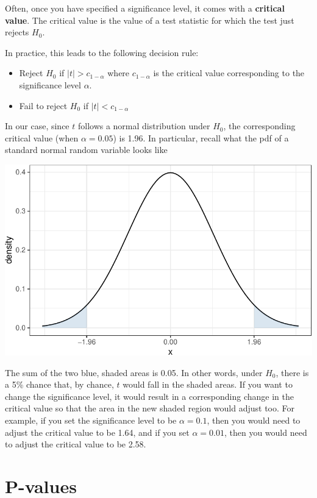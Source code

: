 \documentclass[
  letterpaper,
  DIV=11,
  numbers=noendperiod]{scrreprt}
\begin{document}
Often, once you have specified a significance level, it comes with a
\textbf{critical value}. The critical value is the value of a test
statistic for which the test just rejects \(H_0\).

In practice, this leads to the following decision rule:

\begin{itemize}
\item
  Reject \(H_0\) if \(|t| > c_{1-\alpha}\) where \(c_{1-\alpha}\) is the
  critical value corresponding to the significance level \(\alpha\).
\item
  Fail to reject \(H_0\) if \(|t| < c_{1-\alpha}\)
\end{itemize}

In our case, since \(t\) follows a normal distribution under \(H_0\),
the corresponding critical value (when \(\alpha=0.05\)) is 1.96. In
particular, recall what the pdf of a standard normal random variable
looks like

\includegraphics{07-inference_files/figure-pdf/unnamed-chunk-2-1.pdf}

The sum of the two blue, shaded areas is 0.05. In other words, under
\(H_0\), there is a 5\% chance that, by chance, \(t\) would fall in the
shaded areas. If you want to change the significance level, it would
result in a corresponding change in the critical value so that the area
in the new shaded region would adjust too. For example, if you set the
significance level to be \(\alpha=0.1\), then you would need to adjust
the critical value to be 1.64, and if you set \(\alpha=0.01\), then you
would need to adjust the critical value to be 2.58.

\section{P-values}\label{p-values}
\end{document}
